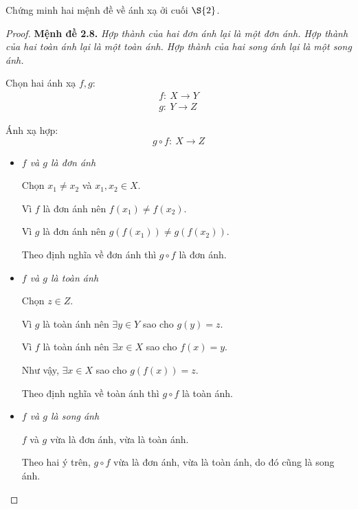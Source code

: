 \documentclass[class=linearalgebra,crop=false]{standalone}
\begin{document}
\begin{exercise}Chứng minh hai mệnh đề về ánh xạ ởi cuối $\S{2}$.
\end{exercise}

\begin{proof}\textbf{Mệnh đề 2.8.} \textit{Hợp thành của hai đơn ánh lại là một đơn ánh. Hợp thành của hai toàn ánh lại là một toàn ánh. Hợp thành của hai song ánh lại là một song ánh.}
    \par Chọn hai ánh xạ $f, g$:
    \begin{gather*}
        f:\ X \rightarrow Y \\
        g:\ Y \rightarrow Z
    \end{gather*}
    \par Ánh xạ hợp:
    \[ g\circ f:\ X \rightarrow Z \]

    \begin{itemize}
        \item \textit{$f$ và $g$ là đơn ánh}

        \par Chọn $x_{1}\ne x_{2}$ và $x_{1}, x_{2} \in X$.
        \par Vì $f$ là đơn ánh nên $f(x_{1}) \ne f(x_{2})$.
        \par Vì $g$ là đơn ánh nên $g(f(x_{1})) \ne g(f(x_{2}))$.
        \par Theo định nghĩa về đơn ánh thì $g\circ f$ là đơn ánh.

        \item \textit{$f$ và $g$ là toàn ánh}

        \par Chọn $z \in Z$.
        \par Vì $g$ là toàn ánh nên $\exists y\in Y$ sao cho $g(y) = z$.
        \par Vì $f$ là toàn ánh nên $\exists x\in X$ sao cho $f(x) = y$.
        \par Như vậy, $\exists x\in X$ sao cho $g(f(x)) = z$.
        \par Theo định nghĩa về toàn ánh thì $g\circ f$ là toàn ánh.

        \item \textit{$f$ và $g$ là song ánh}

        \par $f$ và $g$ vừa là đơn ánh, vừa là toàn ánh.
        \par Theo hai ý trên, $g\circ f$ vừa là đơn ánh, vừa là toàn ánh, do đó cũng là song ánh.
    \end{itemize}


\end{proof}
\end{document}
